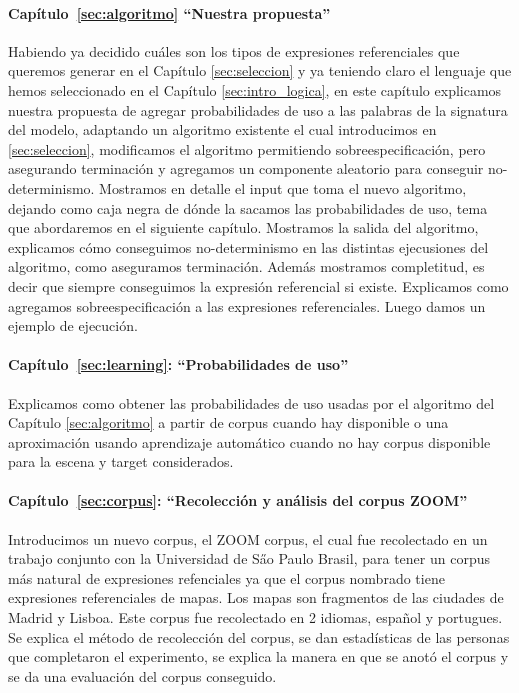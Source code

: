 \paragraph{Cap\'itulo~\ref{sec:algoritmo} ``Nuestra propuesta''} Habiendo ya decidido cu\'ales son los tipos de expresiones referenciales que queremos generar en el Cap\'itulo \ref{sec:seleccion} y ya teniendo
claro el lenguaje \EL que hemos seleccionado en el Cap\'itulo \ref{sec:intro_logica}, en este cap\'itulo 
explicamos nuestra propuesta de agregar probabilidades de uso a las palabras de la signatura del modelo, adaptando un algoritmo existente 
\cite{arec2:2008:Areces} el cual introducimos en \ref{sec:seleccion}, modificamos el algoritmo permitiendo sobreespecificaci\'on, 
pero asegurando terminaci\'on y agregamos un componente aleatorio para conseguir no-determinismo. Mostramos en detalle el input que toma el
 nuevo algoritmo, dejando como caja negra de d\'onde la sacamos las probabilidades de uso, tema que abordaremos en el siguiente cap\'itulo. 
Mostramos la salida del algoritmo, explicamos c\'omo conseguimos no-determinismo en las distintas ejecusiones del algoritmo, como aseguramos 
terminaci\'on. Adem\'as mostramos completitud, es decir que siempre conseguimos la expresi\'on referencial si existe. Explicamos como agregamos sobreespecificaci\'on a las expresiones referenciales. Luego damos un ejemplo de ejecuci\'on. 


\paragraph{Cap\'itulo~\ref{sec:learning}: ``Probabilidades de uso''}
Explicamos como obtener las probabilidades de uso usadas por el algoritmo del Cap\'itulo \ref{sec:algoritmo} a partir de corpus cuando hay disponible o una aproximaci\'on usando aprendizaje autom\'atico cuando no hay corpus disponible para la escena y target considerados. 


\paragraph{Cap\'itulo~\ref{sec:corpus}: ``Recolecci\'on y an\'alisis del corpus ZOOM''}
Introducimos un nuevo corpus, el ZOOM corpus, el cual fue recolectado en un trabajo conjunto con la Universidad de S\H ao Paulo Brasil, para tener un corpus m\'as natural de expresiones refenciales ya que el corpus nombrado tiene expresiones referenciales de mapas. Los mapas son fragmentos de las ciudades de Madrid y Lisboa. Este corpus fue recolectado en 2 idiomas, espa\~nol y portugues. Se explica el m\'etodo de recolecci\'on del corpus, se dan estad\'isticas de las personas que completaron el experimento, se explica la manera en que se anot\'o el corpus y se da una evaluaci\'on del corpus conseguido.

